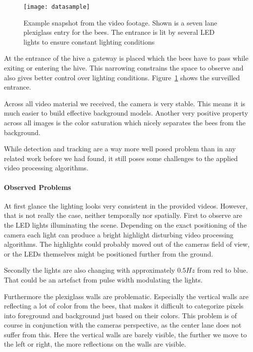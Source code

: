 \documentclass[10pt,a4paper]{article}
\begin{document}
\begin{figure}
\label{fig:beeentrance}
\centering
\texttt{[image: datasample]}
\caption{Example snapshot from the video footage. Shown is a seven lane plexiglass entry for the bees. The entrance is lit by several LED lights to ensure constant lighting conditions}
\end{figure}

At the entrance of the hive a gateway is placed which the bees have to pass while exiting or entering the hive. This narrowing constrains the space to observe and also gives better control over lighting conditions. Figure~\ref{fig:beeentrance} shows the surveilled entrance.  

Across all video material we received, the camera is very stable. This means it is much easier to build effective background models. Another very positive property across all images is the color saturation which nicely separates the bees from the background.

While detection and tracking are a way more well posed problem than in any related work before we had found, it still poses some challenges to the applied video processing algorithms.

\paragraph{Observed Problems} 
At first glance the lighting looks very consistent in the provided videos. However, that is not really the case, neither temporally nor spatially. First to observe are the LED lights illuminating the scene. Depending on the exact positioning of the camera each light can produce a bright highlight disturbing video processing algorithms. The highlights could probably moved out of the cameras field of view, or the LEDs themselves might be positioned further from the ground.

Secondly the lights are also changing with approximately $0.5Hz$ from red to blue. That could be an artefact from pulse width modulating the lights. 

Furthermore the plexiglass walls are problematic. Especially the vertical walls are reflecting a lot of color from the bees, that makes it difficult to categorize pixels into foreground and background just based on their colors. This problem is of course in conjunction with the cameras perspective, as the center lane does not suffer from this. Here the vertical walls are barely visible, the further we move to the left or right, the more reflections on the walls are visible. 
\end{document}

